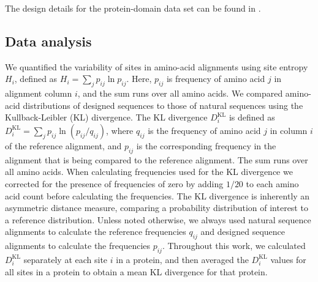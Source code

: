 \documentclass[12pt]{article}
\begin{document}
The design details for the protein-domain data set can be found in \citet{OllikainenKortemme}.
\color{black}

\subsection{Data analysis}

We quantified the variability of sites in amino-acid alignments using site entropy $H_i$, defined as $H_i=\sum_{j}p_{ij}\ln p_{ij}$. Here, $p_{ij}$ is frequency of amino acid $j$ in alignment column $i$, and the sum runs over all amino acids. We compared amino-acid distributions of designed sequences to those of natural sequences using the Kullback-Leibler (KL) divergence. The KL divergence $D^\text{KL}_i$ is defined as $D^\text{KL}_i= \sum_j  p_{ij} \ln  (p_{ij}/q_{ij})$, where $q_{ij}$ is the frequency of amino acid $j$ in column $i$ of the reference alignment, and $p_{ij}$ is the corresponding frequency in the alignment that is being compared to the reference alignment. The sum runs over all amino acids.  When calculating frequencies used for the KL divergence we corrected for the presence of frequencies of zero by adding  $1/20$ to each amino acid count before calculating the frequencies. The KL divergence is inherently an asymmetric distance measure, comparing a probability distribution of interest to a reference distribution. Unless noted otherwise, we always used natural sequence alignments to calculate the reference frequencies $q_{ij}$ and designed sequence alignments to calculate the frequencies $p_{ij}$. Throughout this work, we calculated $D^\text{KL}_i$ separately at each site $i$ in a protein, and then averaged the $D^\text{KL}_i$ values for all sites in a protein to obtain a mean KL divergence for that protein.
\end{document}
